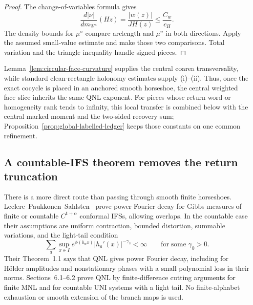 \documentclass[11pt]{article}
\begin{document}
\begin{proof}
The change-of-variables formula gives
\[
 \frac{d|\nu|}{dm_{W^u}}(H z)
 =\frac{|w(z)|}{JH(z)}\le\frac{C_w}{c_H}.
\]
The density bounds for $\mu^u$ compare arclength and $\mu^u$ in both
directions.  Apply the assumed small-value estimate and make those two
comparisons.  Total variation and the triangle inequality handle signed
pieces.
\end{proof}

Lemma~\ref{lem:circular-face-curvature} supplies the central coarea
transversality, while standard clean-rectangle holonomy estimates supply
(i)--(ii).  Thus, once the exact cocycle is placed in an anchored smooth
horseshoe, the central weighted face slice inherits the same QNL exponent.
For pieces whose return word or homogeneity rank tends to infinity, this
local transfer is combined below with the central marked moment and the
two-sided recovery sum; Proposition~\ref{prop:global-labelled-ledger} keeps
those constants on one common refinement.

\subsection{A countable-IFS theorem removes the return truncation}
\label{subsec:countable-ifs}

There is a more direct route than passing through smooth finite horseshoes.
Leclerc--Paukkonen--Sahlsten~\cite{LPS} prove power Fourier decay for Gibbs measures of
finite or countable $C^{1+\alpha}$ conformal IFSs, allowing overlaps.  In the
countable case their assumptions are uniform contraction, bounded distortion,
summable variations, and the light-tail condition
\begin{equation}
\label{eq:lps-light-tail}
 \sum_{a}\sup_{x\in I}
 e^{\phi(h_a x)}|h_a'(x)|^{-\gamma_0}<\infty
 \qquad\text{for some }\gamma_0>0.
\end{equation}
Their Theorem~1.1 says that QNL gives power Fourier decay, including for
H\"older amplitudes and nonstationary phases with a small polynomial loss in
their norms.  Sections~6.1--6.2 prove QNL by finite-difference cutting
arguments for finite MNL and for countable UNI systems with a light tail.  No
finite-alphabet exhaustion or smooth extension of the branch maps is used.
\end{document}
